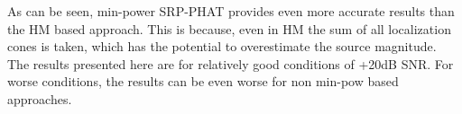 As can be seen, min-power SRP-PHAT provides even more accurate results than the HM based approach. This is because, even in HM the sum of all localization cones is taken, which has the potential to overestimate the source magnitude. The results presented here are for relatively good conditions of +20dB SNR. For worse conditions, the results can be even worse for non min-pow based approaches.